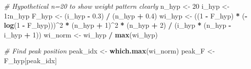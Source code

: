\documentclass[
]{article}
\newenvironment{Shaded}{\begin{snugshade}}{\end{snugshade}}
\newcommand{\CommentTok}[1]{\textcolor[rgb]{0.56,0.35,0.01}{\textit{#1}}}
\newcommand{\DecValTok}[1]{\textcolor[rgb]{0.00,0.00,0.81}{#1}}
\newcommand{\FloatTok}[1]{\textcolor[rgb]{0.00,0.00,0.81}{#1}}
\newcommand{\FunctionTok}[1]{\textcolor[rgb]{0.13,0.29,0.53}{\textbf{#1}}}
\newcommand{\NormalTok}[1]{#1}
\newcommand{\OtherTok}[1]{\textcolor[rgb]{0.56,0.35,0.01}{#1}}
\newcommand{\SpecialCharTok}[1]{\textcolor[rgb]{0.81,0.36,0.00}{\textbf{#1}}}
\begin{document}
\begin{Shaded}
\begin{Highlighting}[]
\CommentTok{\# Hypothetical n=20 to show weight pattern clearly}
\NormalTok{n\_hyp }\OtherTok{\textless{}{-}} \DecValTok{20}
\NormalTok{i\_hyp }\OtherTok{\textless{}{-}} \DecValTok{1}\SpecialCharTok{:}\NormalTok{n\_hyp}
\NormalTok{F\_hyp }\OtherTok{\textless{}{-}}\NormalTok{ (i\_hyp }\SpecialCharTok{{-}} \FloatTok{0.3}\NormalTok{) }\SpecialCharTok{/}\NormalTok{ (n\_hyp }\SpecialCharTok{+} \FloatTok{0.4}\NormalTok{)}
\NormalTok{wi\_hyp }\OtherTok{\textless{}{-}}\NormalTok{ ((}\DecValTok{1} \SpecialCharTok{{-}}\NormalTok{ F\_hyp) }\SpecialCharTok{*}\NormalTok{ (}\SpecialCharTok{{-}}\FunctionTok{log}\NormalTok{(}\DecValTok{1} \SpecialCharTok{{-}}\NormalTok{ F\_hyp)))}\SpecialCharTok{\^{}}\DecValTok{2} \SpecialCharTok{*}\NormalTok{ (n\_hyp }\SpecialCharTok{+} \DecValTok{1}\NormalTok{)}\SpecialCharTok{\^{}}\DecValTok{2} \SpecialCharTok{*}\NormalTok{ (n\_hyp }\SpecialCharTok{+} \DecValTok{2}\NormalTok{) }\SpecialCharTok{/}
\NormalTok{  (i\_hyp }\SpecialCharTok{*}\NormalTok{ (n\_hyp }\SpecialCharTok{{-}}\NormalTok{ i\_hyp }\SpecialCharTok{+} \DecValTok{1}\NormalTok{))}
\NormalTok{wi\_norm }\OtherTok{\textless{}{-}}\NormalTok{ wi\_hyp }\SpecialCharTok{/} \FunctionTok{max}\NormalTok{(wi\_hyp)}

\CommentTok{\# Find peak position}
\NormalTok{peak\_idx }\OtherTok{\textless{}{-}} \FunctionTok{which.max}\NormalTok{(wi\_norm)}
\NormalTok{peak\_F }\OtherTok{\textless{}{-}}\NormalTok{ F\_hyp[peak\_idx]}


\end{Highlighting}
\end{Shaded}
\end{document}
